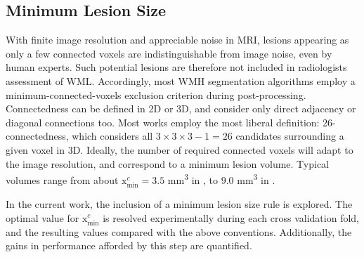 \subsection{Minimum Lesion Size}\label{ss:meth-minx}
With finite image resolution and appreciable noise in MRI, lesions appearing as only a few connected voxels are indistinguishable from image noise, even by human experts.
Such potential lesions are therefore not included in radiologists assessment of WML.
Accordingly, most WMH segmentation algorithms employ a minimum-connected-voxels exclusion criterion during post-processing.
Connectedness can be defined in 2D or 3D, and consider only direct adjacency or diagonal connections too.
Most works employ the most liberal definition: 26-connectedness, which considers all $3\times3\times3-1=26$ candidates surrounding a given voxel in 3D.
Ideally, the number of required connected voxels will adapt to the image resolution, and correspond to a minimum lesion volume.
Typical volumes range from about $\mathrm{x}_{\min}^{c} = 3.5$ mm\textsuperscript{3} in \cite{Steenwijk2013,Fartaria2015}, to $9.0$ mm\textsuperscript{3} in \cite{Yoo2014,Elliott2013}.
\par
In the current work, the inclusion of a minimum lesion size rule is explored.
The optimal value for $\mathrm{x}_{\min}^{c}$ is resolved experimentally during each cross validation fold, and the resulting values compared with the above conventions.
Additionally, the gains in performance afforded by this step are quantified.

